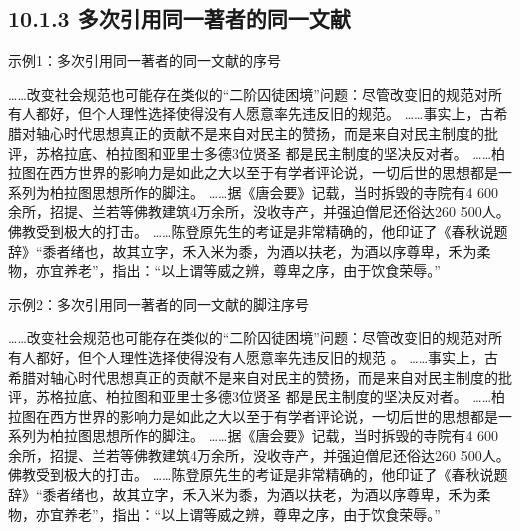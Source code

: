 \documentclass{article}
\begin{document}
\subsection*{10.1.3 多次引用同一著者的同一文献}
\begin{refsection}
示例1：多次引用同一著者的同一文献的序号

……改变社会规范也可能存在类似的“二阶囚徒困境”问题：尽管改变旧的规范对所有人都好，但个人理性选择使得没有人愿意率先违反旧的规范\cite{Sunstein1996-903-903}。
……事实上，古希腊对轴心时代思想真正的贡献不是来自对民主的赞扬，而是来自对民主制度的批评，苏格拉底、柏拉图和亚里士多德3位贤圣
都是民主制度的坚决反对者。
……柏拉图在西方世界的影响力是如此之大以至于有学者评论说，一切后世的思想都是一系列为柏拉图思想所作的脚注\cite{罗杰斯2011-15-16}。
……据《唐会要》记载，当时拆毁的寺院有4 600余所，招提、兰若等佛教建筑4万余所，没收寺产，并强迫僧尼还俗达260 500人。
佛教受到极大的打击。
……陈登原先生的考证是非常精确的，他印证了《春秋说题辞》“黍者绪也，故其立字，禾入米为黍，为酒以扶老，为酒以序尊卑，禾为柔物，亦宜养老”，指出：“以上谓等威之辨，尊卑之序，由于饮食荣辱。”\cite{陈登原2000-29-29}

\printbibliography[heading=subbibliography,title={参考文献}]
\end{refsection}

\begin{refsection}
示例2：多次引用同一著者的同一文献的脚注序号

……改变社会规范也可能存在类似的“二阶囚徒困境”问题：尽管改变旧的规范对所有人都好，但个人理性选择使得没有人愿意率先违反旧的规范
。
……事实上，古希腊对轴心时代思想真正的贡献不是来自对民主的赞扬，而是来自对民主制度的批评，苏格拉底、柏拉图和亚里士多德3位贤圣
都是民主制度的坚决反对者。
……柏拉图在西方世界的影响力是如此之大以至于有学者评论说，一切后世的思想都是一系列为柏拉图思想所作的脚注。
……据《唐会要》记载，当时拆毁的寺院有4 600余所，招提、兰若等佛教建筑4万余所，没收寺产，并强迫僧尼还俗达260 500人。
佛教受到极大的打击。
……陈登原先生的考证是非常精确的，他印证了《春秋说题辞》“黍者绪也，故其立字，禾入米为黍，为酒以扶老，为酒以序尊卑，禾为柔物，亦宜养老”，指出：“以上谓等威之辨，尊卑之序，由于饮食荣辱。”
\end{refsection}
\end{document}
